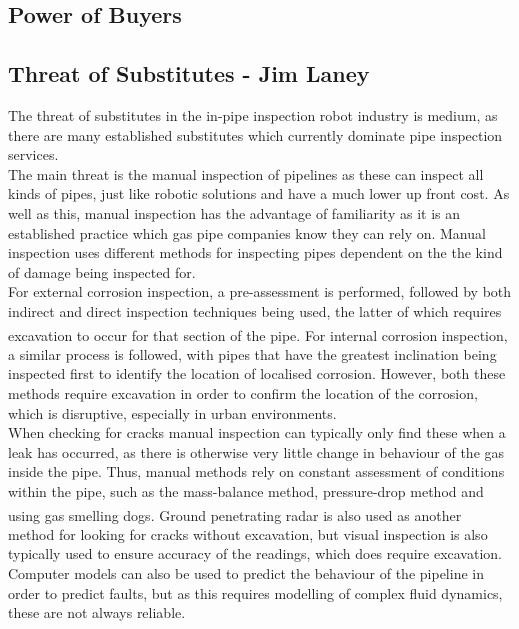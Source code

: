 \documentclass[11pt]{article}		%
\begin{document}
		\subsection[Power of Buyers]{Power of Buyers}
		
		\subsection[Threat of Substitutes]{Threat of Substitutes - Jim Laney}
			
			The threat of substitutes in the in-pipe inspection robot industry is medium, as there are many established substitutes which currently dominate pipe inspection services.
			\\
			The main threat is the manual inspection of pipelines as these can inspect all kinds of pipes, just like robotic solutions and have a much lower up front cost.
			As well as this, manual inspection has the advantage of familiarity as it is an established practice which gas pipe companies know they can rely on.
			Manual inspection uses different methods for inspecting pipes dependent on the the kind of damage being inspected for.
			\\
			For external corrosion inspection, a pre-assessment is performed, followed by both indirect and direct inspection techniques being used, the latter of which requires excavation to occur for that section of the pipe\textsuperscript{\cite{kishawy2010review}}. 
			For internal corrosion inspection, a similar process is followed, with pipes that have the greatest inclination being inspected first to identify the location of localised corrosion. 
			However, both these methods require excavation in order to confirm the location of the corrosion, which is disruptive, especially in urban environments.
			\\
			When checking for cracks manual inspection can typically only find these when a leak has occurred, as there is otherwise very little change in behaviour of the gas inside the pipe.
			Thus, manual methods rely on constant assessment of conditions within the pipe, such as the mass-balance method, pressure-drop method and using gas smelling dogs\textsuperscript{\cite{kishawy2010review}}.
			Ground penetrating radar is also used as another method for looking for cracks without excavation, but visual inspection is also typically used to ensure accuracy of the readings, which does require excavation.
			Computer models can also be used to predict the behaviour of the pipeline in order to predict faults, but as this requires modelling of complex fluid dynamics, these are not always reliable.
\end{document}

